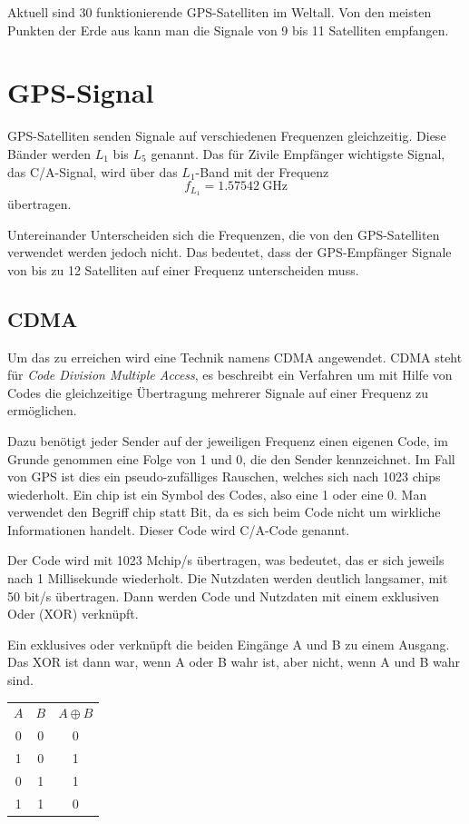 \documentclass[12pt,a4paper]{scrartcl}
\begin{document}
Aktuell sind 30 funktionierende GPS-Satelliten im Weltall. Von den meisten Punkten der Erde aus kann man die Signale von 9 bis 11 Satelliten empfangen.

\section{GPS-Signal}
GPS-Satelliten senden Signale auf verschiedenen Frequenzen gleichzeitig. Diese Bänder werden $L_1$ bis $L_5$ genannt. Das für Zivile Empfänger wichtigste Signal, das C/A-Signal, wird über das $L_1$-Band mit der Frequenz
\begin{equation}
f_{L_1} = \SI{1.57542}{\giga\hertz} \nonumber
\end{equation}
übertragen.

Untereinander Unterscheiden sich die Frequenzen, die von den GPS-Satelliten verwendet werden jedoch nicht. Das bedeutet, dass der GPS-Empfänger Signale von bis zu 12 Satelliten auf einer Frequenz unterscheiden muss.

\subsection{CDMA}

Um das zu erreichen wird eine Technik namens CDMA angewendet.
CDMA steht für \emph{Code Division Multiple Access}, es beschreibt ein Verfahren um mit Hilfe von Codes die gleichzeitige Übertragung mehrerer Signale auf einer Frequenz zu ermöglichen.

Dazu benötigt jeder Sender auf der jeweiligen Frequenz einen eigenen Code, im Grunde genommen eine Folge von 1 und 0, die den Sender kennzeichnet. Im Fall von GPS ist dies ein pseudo-zufälliges Rauschen, welches sich nach 1023 chips wiederholt. Ein chip ist ein Symbol des Codes, also eine 1 oder eine 0. Man verwendet den Begriff chip statt Bit, da es sich beim Code nicht um wirkliche Informationen handelt. Dieser Code wird C/A-Code genannt.

Der Code wird mit 1023 Mchip/s übertragen, was bedeutet, das er sich jeweils nach 1 Millisekunde wiederholt.
Die Nutzdaten werden deutlich langsamer, mit 50 bit/s übertragen. Dann werden Code und Nutzdaten mit einem exklusiven Oder (XOR) verknüpft.

Ein exklusives oder verknüpft die beiden Eingänge A und B zu einem Ausgang. Das XOR ist dann war, wenn A oder B wahr ist, aber nicht, wenn A und B wahr sind.

\begin{center}
\begin{tabular}{cc|c}
\textbf{$A$} & \textbf{$B$} & \textbf{$A\oplus B$} \\
0 & 0 & 0 \\
1 & 0 & 1 \\
0 & 1 & 1 \\
1 & 1 & 0 \\
\end{tabular}
\end{center}
\end{document}
